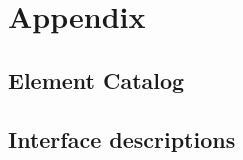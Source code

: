 \section{Appendix}
\subsection{Element Catalog}
\label{sec:ElementCatalog}

\subsection{Interface descriptions}
\label{sec:InterfaceDescription}

%

